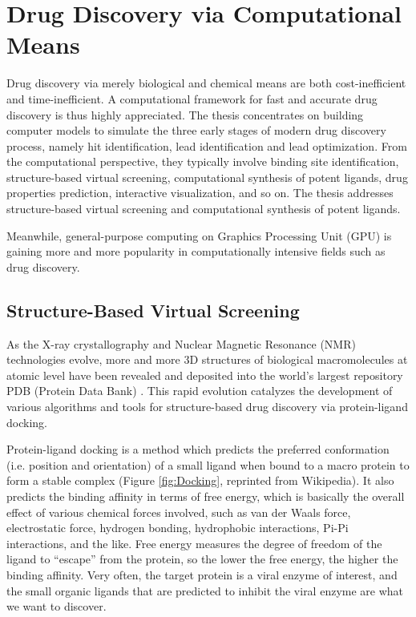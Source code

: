 \section{Drug Discovery via Computational Means}

Drug discovery via merely biological and chemical means are both cost-inefficient and time-inefficient. A computational framework for fast and accurate drug discovery is thus highly appreciated. The thesis concentrates on building computer models to simulate the three early stages of modern drug discovery process, namely hit identification, lead identification and lead optimization. From the computational perspective, they typically involve binding site identification, structure-based virtual screening, computational synthesis of potent ligands, drug properties prediction, interactive visualization, and so on. The thesis addresses structure-based virtual screening and computational synthesis of potent ligands.

Meanwhile, general-purpose computing on Graphics Processing Unit (GPU) is gaining more and more popularity in computationally intensive fields such as drug discovery.

\subsection{Structure-Based Virtual Screening}

As the X-ray crystallography and Nuclear Magnetic Resonance (NMR) technologies evolve, more and more 3D structures of biological macromolecules at atomic level have been revealed and deposited into the world's largest repository PDB (Protein Data Bank) \citep{540-2000,539-2000,537-2003,105-2007,538-2008}. This rapid evolution catalyzes the development of various algorithms and tools for structure-based drug discovery via protein-ligand docking.

Protein-ligand docking is a method which predicts the preferred conformation (i.e. position and orientation) of a small ligand when bound to a macro protein to form a stable complex (Figure \ref{fig:Docking}, reprinted from Wikipedia). It also predicts the binding affinity in terms of free energy, which is basically the overall effect of various chemical forces involved, such as van der Waals force, electrostatic force, hydrogen bonding, hydrophobic interactions, Pi-Pi interactions, and the like. Free energy measures the degree of freedom of the ligand to ``escape'' from the protein, so the lower the free energy, the higher the binding affinity. Very often, the target protein is a viral enzyme of interest, and the small organic ligands that are predicted to inhibit the viral enzyme are what we want to discover.

